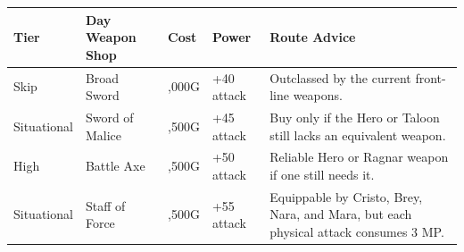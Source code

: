 \documentclass[
  american,
  10pt,
  letterpaper,
  oneside,
  open=any]{scrreprt}
\newcounter{none} %
\newenvironment{guidetable}{%
  \small\setstretch{1.0}%
  \setlength{\tabcolsep}{4pt}%
  \setlength{\LTpre}{8pt}\setlength{\LTpost}{10pt}%
  \renewcommand{\arraystretch}{1.16}%
}{ }
\begin{document}
\begin{guidetable}

{\def\LTcaptype{none} %
\begin{longtable}[]{@{}
  >{\raggedright\arraybackslash}p{}
  >{\raggedright\arraybackslash}p{}
  >{\raggedleft\arraybackslash}p{}
  >{\raggedleft\arraybackslash}p{}
  >{\raggedright\arraybackslash}p{}@{}}
\toprule\noalign{}
\begin{minipage}[b]{\linewidth}\raggedright
\color{GuideGreen}\bfseries Tier
\end{minipage} & \begin{minipage}[b]{\linewidth}\raggedright
\color{GuideGreen}\bfseries Day Weapon Shop
\end{minipage} & \begin{minipage}[b]{\linewidth}\raggedleft
\color{GuideGreen}\bfseries Cost
\end{minipage} & \begin{minipage}[b]{\linewidth}\raggedleft
\color{GuideGreen}\bfseries Power
\end{minipage} & \begin{minipage}[b]{\linewidth}\raggedright
\color{GuideGreen}\bfseries Route Advice
\end{minipage} \\
\midrule\noalign{}
\endhead
\bottomrule\noalign{}
\endlastfoot
Skip & Broad Sword & 2,000G & +40 attack & Outclassed by the current
front-line weapons. \\
Situational & Sword of Malice & 3,500G & +45 attack & Buy only if the
Hero or Taloon still lacks an equivalent weapon. \\
High & Battle Axe & 5,500G & +50 attack & Reliable Hero or Ragnar weapon
if one still needs it. \\
Situational & Staff of Force & 2,500G & +55 attack & Equippable by
Cristo, Brey, Nara, and Mara, but each physical attack consumes 3 MP. \\
\end{longtable}
}

\end{guidetable}
\end{document}
